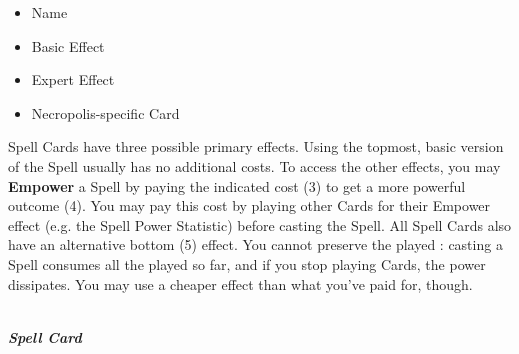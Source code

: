 \bigskip
\begin{multicols}{2}
\begin{multicols*}{2}
  \footnotesize
  \begin{itemize}
    \item[\textbf{1.}] Name
    \item[\textbf{2.}] Basic Effect\\
    \item[\textbf{3.}] Expert Effect
    \item[\textbf{4.}] Necropolis-specific Card
  \end{itemize}
\end{multicols*}
\columnbreak
\centering
\end{multicols}

\clearpage
\begin{multicols*}{2}

Spell Cards have three possible primary effects.
Using the topmost, basic version of the Spell usually has no additional costs.
To access the other effects, you may \textbf{Empower} a Spell by paying the indicated cost (3) to get a more powerful outcome (4).
You may pay this cost by playing other Cards for their Empower  effect (e.g. the Spell Power Statistic) before casting the Spell.
All Spell Cards also have an alternative bottom (5)  effect.
You cannot preserve the played : casting a Spell consumes all the  played so far, and if you stop playing Cards, the power dissipates.
You may use a cheaper  effect than what you've paid for, though.\par

{
  \centering
  \\
  \medskip
  \footnotesize
  \textbf{\textit{\textcolor{darkcandyapplered}{Spell Card}}}\par

}
\end{multicols*}
